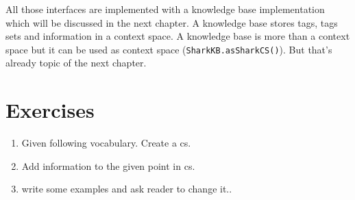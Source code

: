 All those interfaces are implemented with a knowledge base implementation which will be discussed in the next chapter. A knowledge base stores tags, tags sets and information in a context space. A knowledge base is more than a context space but it can be used as context space ({\tt SharkKB.asSharkCS()}). But that's already topic of the next chapter.

\section{Exercises}
\begin{enumerate}
\item 
Given following vocabulary. Create a cs.
\item 
Add information to the given point in cs.
\item 
write some examples and ask reader to change it..
\end{enumerate}
